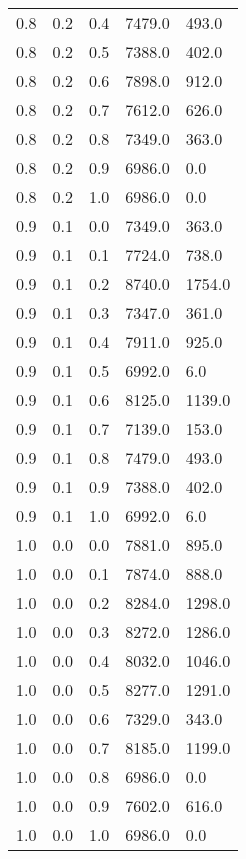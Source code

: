 \begin{longtable}{ l | l | l | l | l}
    0.8&          0.2&          0.4&       7479.0&        493.0\\
    0.8&          0.2&          0.5&       7388.0&        402.0\\
    0.8&          0.2&          0.6&       7898.0&        912.0\\
    0.8&          0.2&          0.7&       7612.0&        626.0\\
    0.8&          0.2&          0.8&       7349.0&        363.0\\
    0.8&          0.2&          0.9&       6986.0&          0.0\\
    0.8&          0.2&          1.0&       6986.0&          0.0\\
    0.9&          0.1&          0.0&       7349.0&        363.0\\
    0.9&          0.1&          0.1&       7724.0&        738.0\\
    0.9&          0.1&          0.2&       8740.0&       1754.0\\
    0.9&          0.1&          0.3&       7347.0&        361.0\\
    0.9&          0.1&          0.4&       7911.0&        925.0\\
    0.9&          0.1&          0.5&       6992.0&          6.0\\
    0.9&          0.1&          0.6&       8125.0&       1139.0\\
    0.9&          0.1&          0.7&       7139.0&        153.0\\
    0.9&          0.1&          0.8&       7479.0&        493.0\\
    0.9&          0.1&          0.9&       7388.0&        402.0\\
    0.9&          0.1&          1.0&       6992.0&          6.0\\
    1.0&          0.0&          0.0&       7881.0&        895.0\\
    1.0&          0.0&          0.1&       7874.0&        888.0\\
    1.0&          0.0&          0.2&       8284.0&       1298.0\\
    1.0&          0.0&          0.3&       8272.0&       1286.0\\
    1.0&          0.0&          0.4&       8032.0&       1046.0\\
    1.0&          0.0&          0.5&       8277.0&       1291.0\\
    1.0&          0.0&          0.6&       7329.0&        343.0\\
    1.0&          0.0&          0.7&       8185.0&       1199.0\\
    1.0&          0.0&          0.8&       6986.0&          0.0\\
    1.0&          0.0&          0.9&       7602.0&        616.0\\
    1.0&          0.0&          1.0&       6986.0&          0.0\\
\end{longtable}